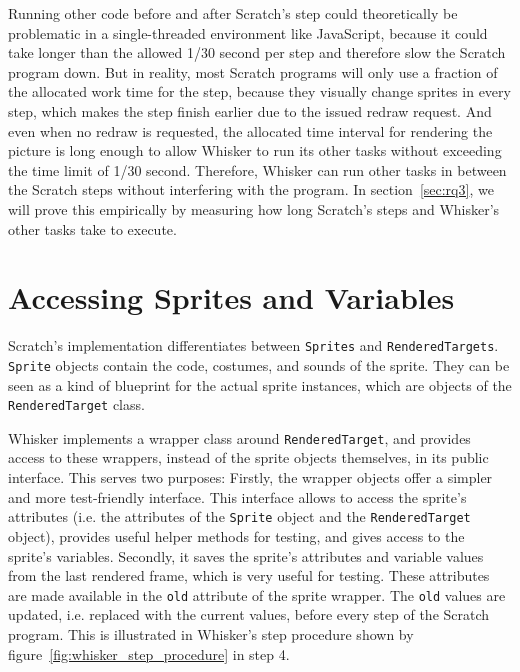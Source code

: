 Running other code before and after Scratch's step could theoretically be problematic in a single-threaded environment like JavaScript,
because it could take longer than the allowed 1/30 second per step and therefore slow the Scratch program down.
But in reality, most Scratch programs will only use a fraction of the allocated work time for the step,
because they visually change sprites in every step, which makes the step finish earlier due to the issued redraw request.
And even when no redraw is requested,
the allocated time interval for rendering the picture is long enough to allow Whisker to run its other tasks without exceeding the time limit of 1/30 second.
Therefore, Whisker can run other tasks in between the Scratch steps without interfering with the program.
In section~\ref{sec:rq3}, we will prove this empirically by measuring how long Scratch's steps and Whisker's other tasks take to execute.


\section{Accessing Sprites and Variables}
\label{sec:accessing_sprites_and_variables}

Scratch's implementation differentiates between \texttt{Sprites} and \texttt{RenderedTargets}.
\texttt{Sprite} objects contain the code, costumes, and sounds of the sprite.
They can be seen as a kind of blueprint for the actual sprite instances, which are objects of the \texttt{RenderedTarget} class.
\parspace

Whisker implements a wrapper class around \texttt{RenderedTarget},
and provides access to these wrappers, instead of the sprite objects themselves, in its public interface.
This serves two purposes:
Firstly, the wrapper objects offer a simpler and more test-friendly interface.
This interface allows to access the sprite's attributes (i.e. the attributes of the \texttt{Sprite} object and the \texttt{RenderedTarget} object),
provides useful helper methods for testing,
and gives access to the sprite's variables.
Secondly, it saves the sprite's attributes and variable values from the last rendered frame,
which is very useful for testing.
These attributes are made available in the \texttt{old} attribute of the sprite wrapper.
The \texttt{old} values are updated, i.e. replaced with the current values,
before every step of the Scratch program.
This is illustrated in Whisker's step procedure shown by figure~\ref{fig:whisker_step_procedure} in step 4.
\parspace

